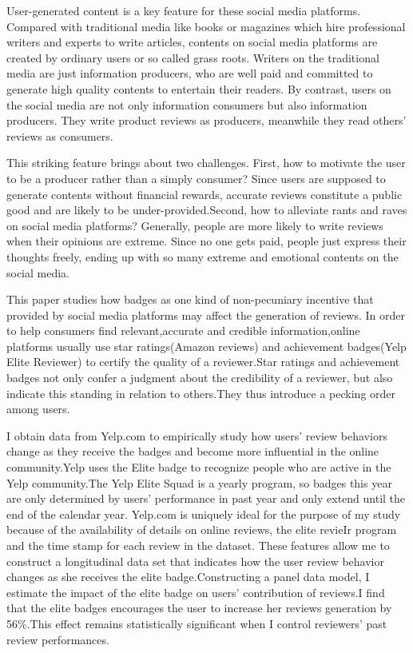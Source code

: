 \documentclass[12pt]{article}%
\begin{document}
User-generated content is a key feature for these social media platforms. Compared with traditional media like books or magazines which hire professional writers and experts to write articles, contents on social media platforms are created by ordinary users or so called grass roots. Writers on the traditional media are just information producers, who are well paid and committed to generate high quality contents to entertain their readers. By contrast, users on the social media are not only information consumers but also information producers. They write product reviews as producers, meanwhile they read others' reviews as consumers.       

This striking feature brings about two challenges. First, how to motivate the user to be a producer rather than a simply consumer? Since users are supposed to generate contents without financial rewards, accurate reviews constitute a public good and are likely to be under-provided\citep{avery1999market,miller2005eliciting}.Second, how to alleviate rants and raves on social media platforms? Generally, people are more likely to write reviews when their opinions are extreme\citep{hu2006}. Since no one gets paid, people just express their thoughts freely, ending up with so many extreme and emotional contents on the social media.

This paper studies how badges as one kind of non-pecuniary incentive that provided by social  
media platforms may affect the generation of  reviews. In order to help consumers find relevant,accurate and credible information,online platforms usually use star ratings(Amazon reviews) and achievement badges(Yelp Elite Reviewer) to certify the quality of a reviewer.Star ratings and achievement badges not only confer a judgment about the credibility of a reviewer, but also indicate this standing in relation to others.They thus introduce a pecking order among users\citep{dellarocas2010}.

I obtain data from Yelp.com to empirically study how users' review behaviors change as they receive the badges and become more influential in the online community.Yelp uses the Elite badge to recognize people who are active in the Yelp community.The Yelp Elite Squad is a yearly program, so badges this year are only determined by users' performance in past year and only extend until the end of the calendar year. Yelp.com is uniquely ideal for the purpose of my study because of the availability of details on online reviews, the elite revieIr program and the time stamp for each review in the dataset. These features allow me to construct a longitudinal data set that indicates how the user review behavior changes as she receives the elite badge.Constructing a panel data model, I estimate the impact of the elite badge on users' contribution of reviews.I find that the elite badges encourages the user to increase her reviews generation by 56\%.This effect remains statistically significant when I control reviewers' past review performances. 
\end{document}
